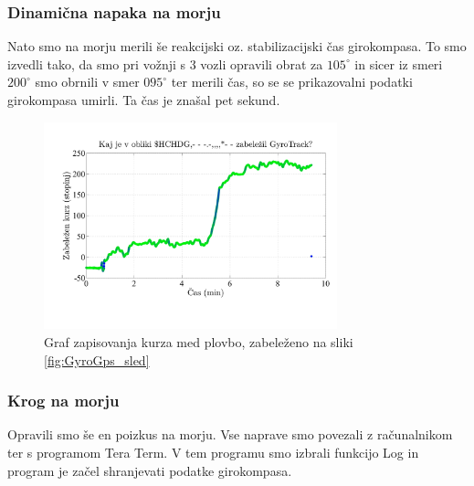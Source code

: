 \subsubsection{Dinamična napaka na morju}
Nato smo na morju merili še reakcijski oz. stabilizacijski čas girokompasa. To smo izvedli tako, da smo pri vožnji s 3 vozli opravili obrat za $105^{\circ}$ in sicer iz smeri $200^{\circ}$ smo obrnili v smer $095^{\circ}$ ter merili čas, so se se prikazovalni podatki girokompasa umirli. Ta čas je znašal pet sekund.
\begin{figure}
	\centering
	\includegraphics[height=6cm]{Vaje/VzorecPoroc/figs/2014-04-10_KurzPoti_Gyrotrack.pdf}
	\caption{Graf zapisovanja kurza med plovbo, zabeleženo na sliki \ref{fig:GyroGps_sled}}
	\label{fig:Gyro_krog}       %
\end{figure}


\subsubsection{Krog na morju}
Opravili smo še en poizkus na morju. Vse naprave smo povezali z računalnikom ter s programom Tera Term. V tem programu smo izbrali funkcijo Log in program je začel shranjevati podatke girokompasa.

